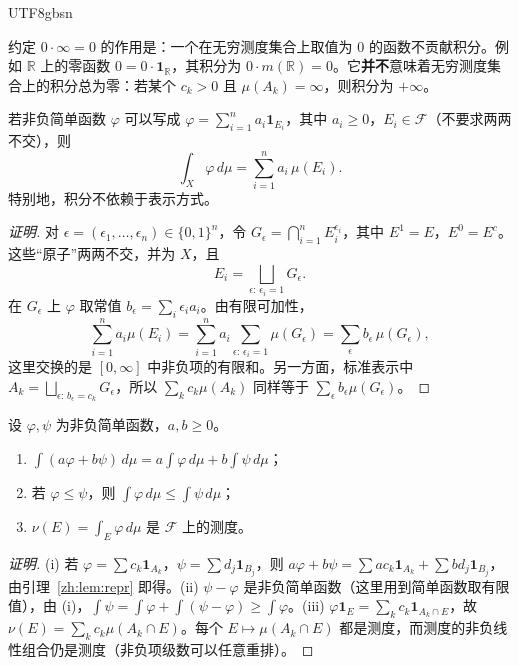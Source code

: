 \documentclass[11pt]{article}
\makeatletter
\newcommand{\envlabel}[1]{\protected@edef\@currentlabel{\themathenv}\label{#1}}
\makeatother
\begin{document}
\begin{CJK*}{UTF8}{gbsn}
\begin{remark}
约定 $0\cdot\infty=0$ 的作用是：一个在无穷测度集合上取值为 $0$ 的函数不贡献积分。例如 $\mathbb{R}$ 上的零函数 $0=0\cdot\mathbf{1}_{\mathbb{R}}$，其积分为 $0\cdot m(\mathbb{R})=0$。它\textbf{并不}意味着无穷测度集合上的积分总为零：若某个 $c_{k}>0$ 且 $\mu(A_{k})=\infty$，则积分为 $+\infty$。
\end{remark}

\begin{lemma}\envlabel{zh:lem:repr}
若非负简单函数 $\varphi$ 可以写成 $\varphi=\sum_{i=1}^{n}a_{i}\mathbf{1}_{E_{i}}$，其中 $a_{i}\geq0$，$E_{i}\in\mathcal{F}$（不要求两两不交），则
\[
\int_{X}\varphi\,d\mu=\sum_{i=1}^{n}a_{i}\,\mu(E_{i}).
\]
特别地，积分不依赖于表示方式。
\end{lemma}

\begin{proof}[证明]
对 $\epsilon=(\epsilon_{1},\ldots,\epsilon_{n})\in\{0,1\}^{n}$，令 $G_{\epsilon}=\bigcap_{i=1}^{n}E_{i}^{\epsilon_{i}}$，其中 $E^{1}=E$，$E^{0}=E^{c}$。这些“原子”两两不交，并为 $X$，且
\[
E_{i}=\bigsqcup_{\epsilon:\,\epsilon_{i}=1}G_{\epsilon}.
\]
在 $G_{\epsilon}$ 上 $\varphi$ 取常值 $b_{\epsilon}=\sum_{i}\epsilon_{i}a_{i}$。由有限可加性，
\[
\sum_{i=1}^{n}a_{i}\mu(E_{i})=\sum_{i=1}^{n}a_{i}\sum_{\epsilon:\,\epsilon_{i}=1}\mu(G_{\epsilon})=\sum_{\epsilon}b_{\epsilon}\,\mu(G_{\epsilon}),
\]
这里交换的是 $[0,\infty]$ 中非负项的有限和。另一方面，标准表示中 $A_{k}=\bigsqcup_{\epsilon:\,b_{\epsilon}=c_{k}}G_{\epsilon}$，所以 $\sum_{k}c_{k}\mu(A_{k})$ 同样等于 $\sum_{\epsilon}b_{\epsilon}\mu(G_{\epsilon})$。
\end{proof}

\begin{proposition}\envlabel{zh:prop:simpleint}
设 $\varphi,\psi$ 为非负简单函数，$a,b\geq0$。
\begin{enumerate}
  \item $\int(a\varphi+b\psi)\,d\mu=a\int\varphi\,d\mu+b\int\psi\,d\mu$；
  \item 若 $\varphi\leq\psi$，则 $\int\varphi\,d\mu\leq\int\psi\,d\mu$；
  \item $\nu(E)=\int_{E}\varphi\,d\mu$ 是 $\mathcal{F}$ 上的测度。
\end{enumerate}
\end{proposition}

\begin{proof}[证明]
(i) 若 $\varphi=\sum c_{k}\mathbf{1}_{A_{k}}$，$\psi=\sum d_{j}\mathbf{1}_{B_{j}}$，则 $a\varphi+b\psi=\sum ac_{k}\mathbf{1}_{A_{k}}+\sum bd_{j}\mathbf{1}_{B_{j}}$，由引理~\ref{zh:lem:repr} 即得。(ii) $\psi-\varphi$ 是非负简单函数（这里用到简单函数取有限值），由 (i)，$\int\psi=\int\varphi+\int(\psi-\varphi)\geq\int\varphi$。(iii) $\varphi\mathbf{1}_{E}=\sum_{k}c_{k}\mathbf{1}_{A_{k}\cap E}$，故 $\nu(E)=\sum_{k}c_{k}\mu(A_{k}\cap E)$。每个 $E\mapsto\mu(A_{k}\cap E)$ 都是测度，而测度的非负线性组合仍是测度（非负项级数可以任意重排）。
\end{proof}


\end{CJK*}
\end{document}
